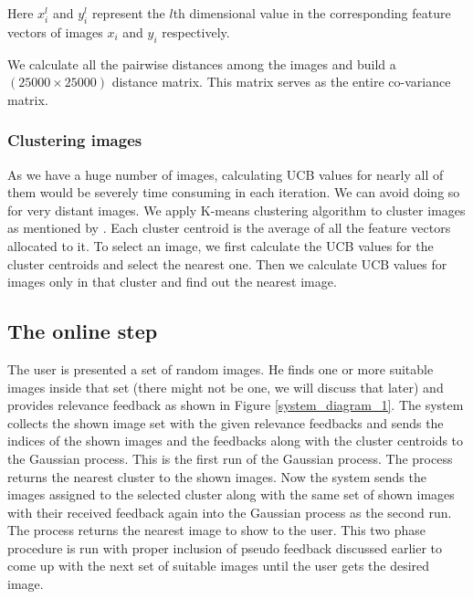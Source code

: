 \documentclass[english]{tktltiki}
\begin{document}
Here $x_i^l$ and $y_i^l$ represent the $l$th dimensional value in the corresponding feature vectors of images $x_i$ and $y_i$ respectively.


We calculate all the pairwise distances among the images and build a $(25000 \times 25000)$ distance matrix. This matrix serves as the entire co-variance matrix.

\subsubsection{Clustering images}

As we have a huge number of images, calculating UCB values for nearly all of them would be severely time consuming in each iteration. We can avoid doing so for very distant images. We apply K-means \cite{k_means} clustering algorithm to cluster images as mentioned by \cite{hierarchical_gp}. Each cluster centroid is the average of all the feature vectors allocated to it. To select an image, we first calculate the UCB values for the cluster centroids and select the nearest one. Then we calculate UCB values for images only in that cluster and find out the nearest image.

\subsection{The online step} \label{experiment_1}

The user is presented a set of random images. He finds one or more suitable images inside that set (there might not be one, we will discuss that later) and provides relevance feedback as shown in Figure \ref{system_diagram_1}. The system collects the shown image set with the given relevance feedbacks and sends the indices of the shown images and the feedbacks along with the cluster centroids to the Gaussian process. This is the first run of the Gaussian process. The process returns the nearest cluster to the shown images. Now the system sends the images assigned to the selected cluster along with the same set of shown images with their received feedback again into the Gaussian process as the second run. The process returns the nearest image to show to the user. This two phase procedure is run with proper inclusion of pseudo feedback discussed earlier to come up with the next set of suitable images until the user gets the desired image.
\end{document}
